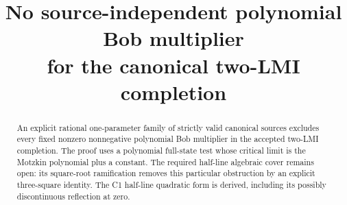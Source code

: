 \documentclass[11pt]{article}
\title{No source-independent polynomial Bob multiplier\\for the canonical two-LMI completion}
\author{}\date{}
\begin{document}
\maketitle\vspace{-1.8em}
\begin{abstract}
An explicit rational one-parameter family of strictly valid canonical sources
excludes every fixed nonzero nonnegative polynomial Bob multiplier in the
accepted two-LMI completion. The proof uses a polynomial full-state test whose
critical limit is the Motzkin polynomial plus a constant. The required
half-line algebraic cover remains open: its square-root ramification removes
this particular obstruction by an explicit three-square identity. The C1
half-line quadratic form is derived, including its possibly discontinuous
reflection at zero.
\end{abstract}
\end{document}
